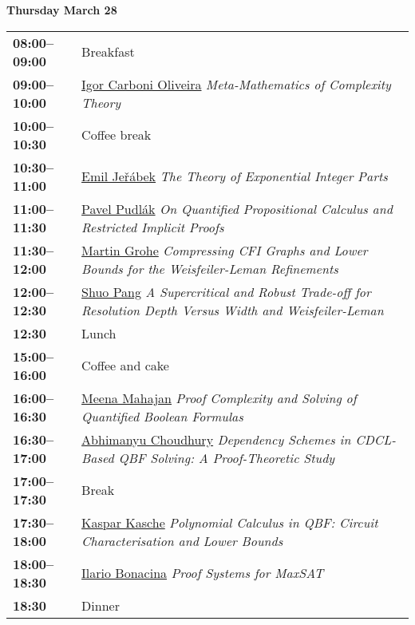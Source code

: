 \documentclass[11pt]{article}
\newcommand{\scheduletablewidth}{5.06in}
\begin{document}
\noindent\begin{minipage}{\textwidth}
\begin{center} {\bf\large Thursday March 28} \end{center}
\begin{tabular}{ p{0.9in} p{\scheduletablewidth} }

{\bf 08:00--09:00}  & Breakfast\\

{\bf 09:00--10:00} & \hyperref[Oliveira]{Igor Carboni Oliveira}
{\em Meta-Mathematics of Complexity Theory} \\

{\bf 10:00--10:30} & {Coffee break} \\

{\bf 10:30--11:00} & \hyperref[Jerabek]{Emil Je\v{r}\'{a}bek}
{\em The Theory of Exponential Integer Parts} \\

{\bf 11:00--11:30} & \hyperref[Pudlak]{Pavel Pudl\'{a}k}
{\em On Quantified Propositional Calculus and Restricted Implicit Proofs} \\

{\bf 11:30--12:00} & \hyperref[Grohe]{Martin Grohe}
{\em Compressing CFI Graphs and Lower Bounds for the Weisfeiler-Leman Refinements} \\

{\bf 12:00--12:30} & \hyperref[Pang]{Shuo Pang}
{\em A Supercritical and Robust Trade-off for Resolution Depth Versus Width and Weisfeiler-Leman} \\



{\bf 12:30%
} &  Lunch\\

{\bf 15:00--16:00} &  Coffee and cake \\

{\bf 16:00--16:30} & \hyperref[Mahajan]{Meena Mahajan}
{\em Proof Complexity and Solving of Quantified Boolean Formulas} \\

{\bf 16:30--17:00} & \hyperref[Choudhury]{Abhimanyu Choudhury}
{\em Dependency Schemes in CDCL-Based QBF Solving: A Proof-Theoretic Study} \\

{\bf 17:00--17:30} & {Break} \\

{\bf 17:30--18:00} & \hyperref[Kasche]{Kaspar Kasche}
{\em Polynomial Calculus in QBF: Circuit Characterisation and Lower Bounds} \\

{\bf 18:00--18:30} & \hyperref[Bonacina]{Ilario Bonacina}
{\em Proof Systems for MaxSAT} \\

{\bf 18:30%
} & Dinner \\
\end{tabular}
\end{minipage}
\end{document}
